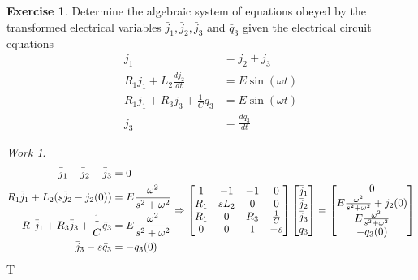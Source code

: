 \documentclass{report}
\theoremstyle{definition}
\newtheorem{exercise}{Exercise}[chapter]
\theoremstyle{remark}
\newtheorem*{work}{Work}
\newcommand{\od}[2]{\frac{d #1}{d#2}}
\begin{document}
\begin{exercise}
    Determine the algebraic system of equations obeyed by the transformed electrical variables $\bar j_1, \bar j_2, \bar j_3$ and $\bar q_3$ given the electrical circuit equations 
    \begin{equation*}
        \begin{split}
            j_1&=j_2+j_3\\
            R_1j_1+L_2\od{j_2}{t} &= E\sin (\omega t)\\
            R_1j_1+R_3j_3+\frac{1}{C}q_3 &= E\sin (\omega t)\\
            j_3&=\od{q_3}{t}
        \end{split}
    \end{equation*}
\end{exercise}
\begin{work}
    \begin{equation*}
        \begin{split}
            \bar j_1-\bar j_2-\bar j_3 &= 0\\
            R_1\bar j_1+L_2(s\bar j_2-j_2(0)) &=E\frac{\omega^2}{s^2+\omega^2}\\
            R_1\bar j_1+R_3\bar j_3+\frac{1}{C}\bar q_3 &= E\frac{\omega^2}{s^2+\omega^2}\\
            \bar j_3-s\bar q_3&=-q_3(0)
        \end{split}
        \newline\Rightarrow \begin{bmatrix}
            1&-1&-1&0\\ R_1&sL_2&0&0\\ R_1&0&R_3&\frac{1}{C}\\0&0&1&-s 
        \end{bmatrix}
        \begin{bmatrix}
            \bar j_1\\\bar j_2 \\\bar j_3 \\\bar q_3
        \end{bmatrix} 
        =\begin{bmatrix}
            0\\E\frac{\omega^2}{s^2+\omega^2}+j_2(0) \\E\frac{\omega^2}{s^2+\omega^2}\\-q_3(0)
        \end{bmatrix}
    \end{equation*}T
\end{work}
\end{document}
